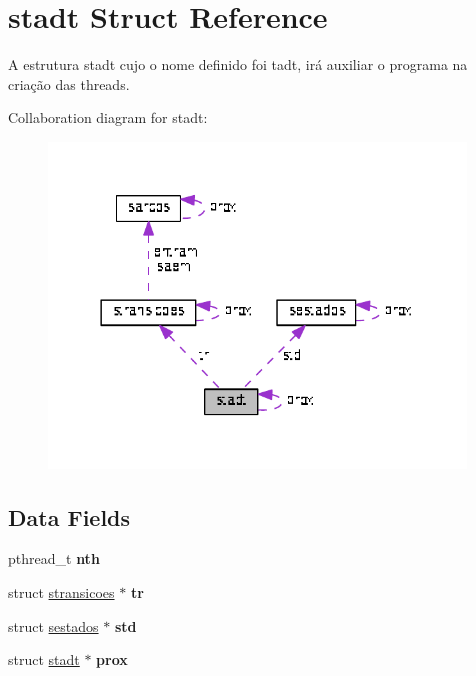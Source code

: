 \hypertarget{structstadt}{\section{stadt Struct Reference}
\label{structstadt}
}



\begin{DoxyItemize}
\item A estrutura stadt cujo o nome definido foi tadt, irá auxiliar o programa na criação das threads. 
\end{DoxyItemize} 




Collaboration diagram for stadt\+:\nopagebreak
\begin{figure}[H]
\begin{center}
\leavevmode
\includegraphics[width=314pt]{structstadt__coll__graph}
\end{center}
\end{figure}
\subsection*{Data Fields}
\begin{DoxyCompactItemize}
\item 
\hypertarget{structstadt_a6b70aec44f3debbafe744148c4d4ecdf}{pthread\+\_\+t {\bfseries nth}}\label{structstadt_a6b70aec44f3debbafe744148c4d4ecdf}

\item 
\hypertarget{structstadt_a9f407187c32ee51a170aad3f1699f042}{struct \hyperlink{structstransicoes}{stransicoes} $\ast$ {\bfseries tr}}\label{structstadt_a9f407187c32ee51a170aad3f1699f042}

\item 
\hypertarget{structstadt_a4d45b2162d0eef245b092ef52da98e5a}{struct \hyperlink{structsestados}{sestados} $\ast$ {\bfseries std}}\label{structstadt_a4d45b2162d0eef245b092ef52da98e5a}

\item 
\hypertarget{structstadt_a3d7dd6a9dcaeab4f8c346ae48437dc35}{struct \hyperlink{structstadt}{stadt} $\ast$ {\bfseries prox}}\label{structstadt_a3d7dd6a9dcaeab4f8c346ae48437dc35}

\end{DoxyCompactItemize}



